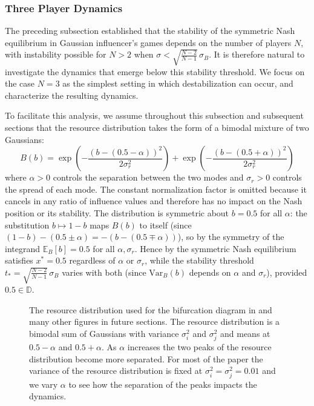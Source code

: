 \documentclass{article}
\begin{document}
            \subsubsection{Three Player Dynamics} \label{subsubsec:SI_three_player_dynamics}
                    The preceding subsection established that the stability of the symmetric Nash equilibrium in Gaussian influencer's games depends on the number of players $N$, with instability possible for $N > 2$ when $\sigma < \sqrt{\frac{N-2}{N-1}}\,\sigma_B$. It is therefore natural to investigate the dynamics that emerge below this stability threshold. We focus on the case $N=3$ as the simplest setting in which destabilization can occur, and characterize the resulting dynamics.

                    To facilitate this analysis, we assume throughout this subsection and subsequent sections that the resource distribution takes the form of a bimodal mixture of two Gaussians:
                    \begin{equation}\label{eq:SI_bimodal_resource_distribution}
                        B(b) = \exp\left(-\frac{(b-(0.5-\alpha))^2}{2\sigma_r^2}\right) + 
                        \exp\left(-\frac{(b-(0.5+\alpha))^2}{2\sigma_r^2}\right)
                    \end{equation}
                    where $\alpha > 0$ controls the separation between the two modes and $\sigma_r > 0$ controls the spread of each mode. The constant normalization factor is omitted because it cancels in any ratio of influence values and therefore has no impact on the Nash position or its stability. The distribution is symmetric about $b = 0.5$ for all $\alpha$: the substitution $b \mapsto 1 - b$ maps $B(b)$ to itself (since $(1{-}b) - (0.5 \pm \alpha) = -(b - (0.5 \mp \alpha))$), so by the symmetry of the integrand $\mathbb{E}_B[b] = 0.5$ for all $\alpha, \sigma_r$. Hence by  the symmetric Nash equilibrium satisfies $x^* = 0.5$ regardless of $\alpha$ or $\sigma_r$, while the stability threshold $t_* = \sqrt{\frac{N-2}{N-1}}\,\sigma_B$ varies with both (since $\mathrm{Var}_B(b)$ depends on $\alpha$ and $\sigma_r$), provided $0.5 \in \mathbb{D}$.
                    \begin{figure}
                        \centering
                        
                        \caption{The resource distribution used for the bifurcation diagram in  and many other figures in future sections. The resource distribution is a bimodal sum of Gaussians with variance $\sigma_i^2$ and $\sigma_j^2$ and means at $0.5-\alpha$ and $0.5+\alpha$. As $\alpha$ increases the two peaks of the resource distribution become more separated. For most of the paper the variance of the resource distribution is fixed at $\sigma_i^2=\sigma_j^2=0.01$ and we vary $\alpha$ to see how the separation of the peaks impacts the dynamics.}
                        \label{fig:bimodal_resource}
                    \end{figure} 
\end{document}
